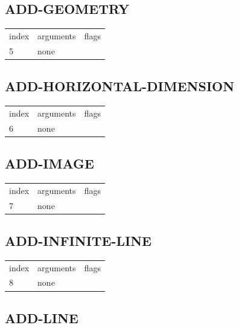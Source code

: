 \documentclass[a4paper]{report}
\begin{document}
{{{{{{{{{{{{{\subsection{ADD-GEOMETRY}

\begin{center}
\begin{tabular}{l | l | l}
index & arguments & flags \\
5 & none & 
\end{tabular}
\end{center}

\subsection{ADD-HORIZONTAL-DIMENSION}

\begin{center}
\begin{tabular}{l | l | l}
index & arguments & flags \\
6 & none & 
\end{tabular}
\end{center}

\subsection{ADD-IMAGE}

\begin{center}
\begin{tabular}{l | l | l}
index & arguments & flags \\
7 & none & 
\end{tabular}
\end{center}

\subsection{ADD-INFINITE-LINE}

\begin{center}
\begin{tabular}{l | l | l}
index & arguments & flags \\
8 & none & 
\end{tabular}
\end{center}

\subsection{ADD-LINE}

}}}}}}}}}}}}}
\end{document}
